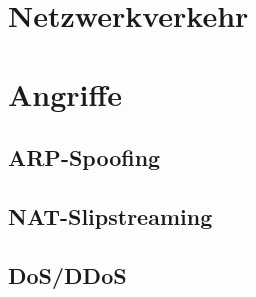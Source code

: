 \section{Netzwerkverkehr}
\section{Angriffe}
\subsection{ARP-Spoofing}
\subsection{NAT-Slipstreaming}
\subsection{DoS/DDoS}
\subsection{}